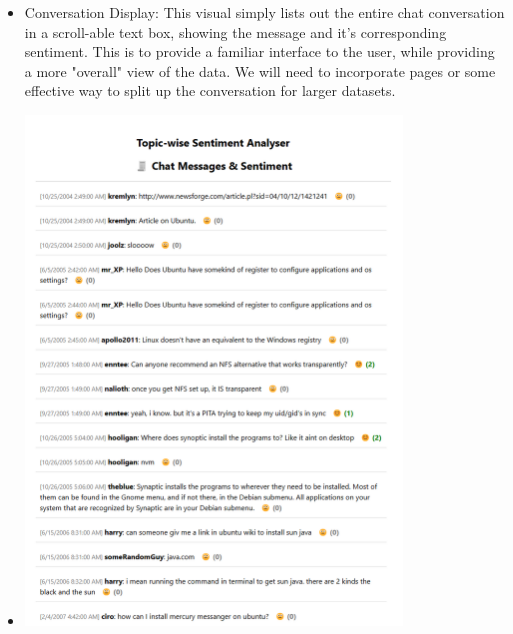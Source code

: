 \documentclass{article}\usepackage{graphicx}
\begin{document}
\begin{itemize}
    \item Conversation Display: This visual simply lists out the entire chat conversation in a scroll-able text box, showing the message and it's corresponding sentiment. This is to provide a familiar interface to the user, while providing a more "overall" view of the data. We will need to incorporate pages or some effective way to split up the conversation for larger datasets.
    \item \includegraphics[width=10cm]{./Latex Images/Chat log ss.png}
\end{itemize}
\end{document}
